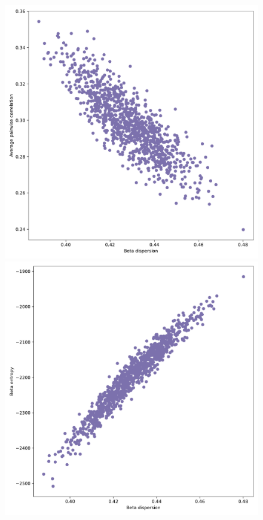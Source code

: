 \documentclass[leqno,12pt]{article}
\begin{document}
{\begin{figure}[htp]
\begin{center}
  \includegraphics[scale=0.33]{img/SampleCorDispersionvsCorrelation1factorsN128T256disp04fvol16minsvol10maxsvol50}
	\includegraphics[scale=0.33]{img/SampleCorDispersionvsEntropy1factorsN128T256disp04fvol16minsvol10maxsvol50}

\end{center}
\end{figure}}
\end{document}
